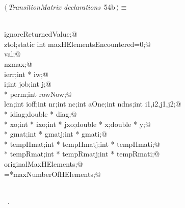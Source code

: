 \documentclass{article}
\begin{document}
\begin{flushleft} \small
\begin{minipage}{\linewidth}\label{scrap80}\raggedright\small
{} $\langle\,${\itshape TransitionMatrix declarations}\nobreak\ {\footnotesize {54b}}$\,\rangle\equiv$
\vspace{-1ex}
\begin{list}{}{} \item
\mbox{}\verb@@\\
\mbox{}\verb@int ignoreReturnedValue;@\\
\mbox{}\verb@double ztol;static int maxHElementsEncountered=0;@\\
\mbox{}\verb@double val;@\\
\mbox{}\verb@int nzmax;@\\
\mbox{}\verb@int ierr;int * iw;@\\
\mbox{}\verb@int i;int job;int j;@\\
\mbox{}\verb@int * perm;int rowNow;@\\
\mbox{}\verb@int len;int ioff;int nr;int nc;int aOne;int ndns;int i1,i2,j1,j2;@\\
\mbox{}\verb@int * idiag;double * diag;@\\
\mbox{}\verb@double * xo;int * ixo;int * jxo;double * x;double * y;@\\
\mbox{}\verb@double * gmat;int * gmatj;int * gmati;@\\
\mbox{}\verb@double * tempHmat;int * tempHmatj;int * tempHmati;@\\
\mbox{}\verb@double * tempRmat;int * tempRmatj;int * tempRmati;@\\
\mbox{}\verb@int originalMaxHElements;@\\
\mbox{}\verb@originalMaxHElements=*maxNumberOfHElements;@\\
\mbox{}\verb@@\\
\mbox{}\verb@@{\NWsep}
\end{list}
\vspace{-1.5ex}
\footnotesize
\begin{list}{}{\setlength{\itemsep}{-\parsep}\setlength{\itemindent}{-\leftmargin}}
\item \NWtxtMacroRefIn\ .

\end{list}
\end{minipage}
\end{flushleft}
\end{document}
